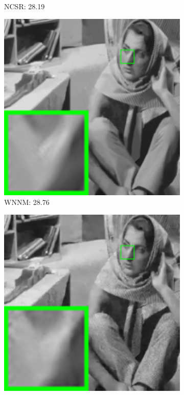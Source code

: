 \begin{figure}
\begin{adjustwidth}{-2cm}{}
\begin{subfigure}[t]{0.19\textwidth}
		\caption{NCSR: 28.19}
    \end{subfigure}
    \hfill
    \begin{subfigure}[t]{0.19\textwidth}
        \centering
        \includegraphics[width=1\textwidth]{images/twsc/awgn/resize_br_WNNM_40_barbara.png}
		\caption{WNNM: 28.76}
    \end{subfigure}
    \hfill
    \begin{subfigure}[t]{0.19\textwidth}
        \centering
        \includegraphics[width=1\textwidth]{images/twsc/awgn/resize_br_TNRD_40_barbara.png}

\end{subfigure}
\end{adjustwidth}
\end{figure}
